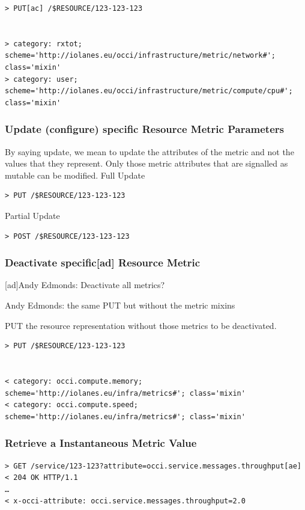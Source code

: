 \documentclass[12pt]{article}  %
\begin{document}
\begin{verbatim}
> PUT[ac] /$RESOURCE/123-123-123


> category: rxtot; scheme='http://iolanes.eu/occi/infrastructure/metric/network#'; class='mixin'
> category: user; scheme='http://iolanes.eu/occi/infrastructure/metric/compute/cpu#'; class='mixin'
\end{verbatim}

\subsubsection{Update (configure) specific Resource Metric Parameters}

By saying update, we mean to update the attributes of the metric and not the values that they represent. Only those metric attributes that are signalled as mutable can be modified.
Full Update
\begin{verbatim}
> PUT /$RESOURCE/123-123-123
\end{verbatim}

Partial Update
\begin{verbatim}
> POST /$RESOURCE/123-123-123
\end{verbatim}

\subsubsection{Deactivate specific[ad] Resource Metric}

{
\color{blue}
[ad]Andy Edmonds:
Deactivate all metrics?

Andy Edmonds:
the same PUT but without the metric mixins
}

PUT the resource representation without those metrics to be deactivated.
\begin{verbatim}
> PUT /$RESOURCE/123-123-123


< category: occi.compute.memory; scheme='http://iolanes.eu/infra/metrics#'; class='mixin'
< category: occi.compute.speed; scheme='http://iolanes.eu/infra/metrics#'; class='mixin'
\end{verbatim}

\subsubsection{Retrieve a Instantaneous Metric Value}
\begin{verbatim}
> GET /service/123-123?attribute=occi.service.messages.throughput[ae]
< 204 OK HTTP/1.1
…
< x-occi-attribute: occi.service.messages.throughput=2.0
\end{verbatim}
\end{document}
